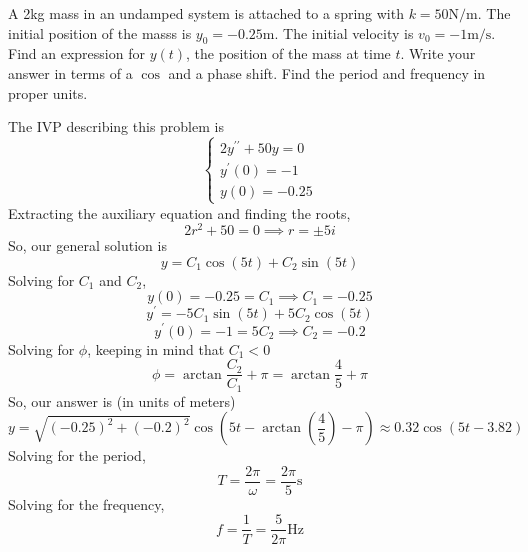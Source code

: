 \begin{example}
	A 2kg mass in an undamped system is attached to a spring with $k = 50 \text{N/m}$. The initial position of the masss is $y_0 = -0.25\text{m}$. The initial velocity is $v_0 = -1\text{m/s}$. Find an expression for $y(t)$, the position of the mass at time $t$. Write your answer in terms of a $\cos$ and a phase shift. Find the period and frequency in proper units.
\end{example}
The IVP describing this problem is
\begin{equation*}
	\begin{cases}
		2y^{\prime\prime} + 50y = 0 \\
		y^\prime(0) = -1 \\
		y(0) = -0.25
	\end{cases}
\end{equation*}
Extracting the auxiliary equation and finding the roots,
\begin{equation*}
	2r^2 + 50 = 0 \implies r = \pm 5i
\end{equation*}
So, our general solution is
\begin{equation*}
	y = C_1\cos{(5t)} + C_2\sin{(5t)}
\end{equation*}
Solving for $C_1$ and $C_2$,
\begin{equation*}
	y(0) = -0.25 = C_1 \implies C_1 = -0.25
\end{equation*}
\begin{equation*}
	y^\prime = -5C_1\sin{(5t)} + 5C_2\cos{(5t)}
\end{equation*}
\begin{equation*}
	y^\prime(0) = -1 = 5C_2 \implies C_2 = -0.2
\end{equation*}
Solving for $\phi$, keeping in mind that $C_1 < 0$
\begin{equation*}
	\phi = \arctan{\frac{C_2}{C_1}} + \pi = \arctan{\frac{4}{5}} + \pi
\end{equation*}
So, our answer is (in units of meters)
\begin{equation*}
	y = \sqrt{(-0.25)^2 + (-0.2)^2}\cos{\left(5t - \arctan{\left(\frac{4}{5}\right)} - \pi\right)} \approx 0.32\cos{\left(5t - 3.82\right)}
\end{equation*}
Solving for the period,
\begin{equation*}
	T = \frac{2\pi}{\omega} = \frac{2\pi}{5} \text{s}
\end{equation*}
Solving for the frequency,
\begin{equation*}
	f = \frac{1}{T} = \frac{5}{2\pi} \text{Hz}
\end{equation*}